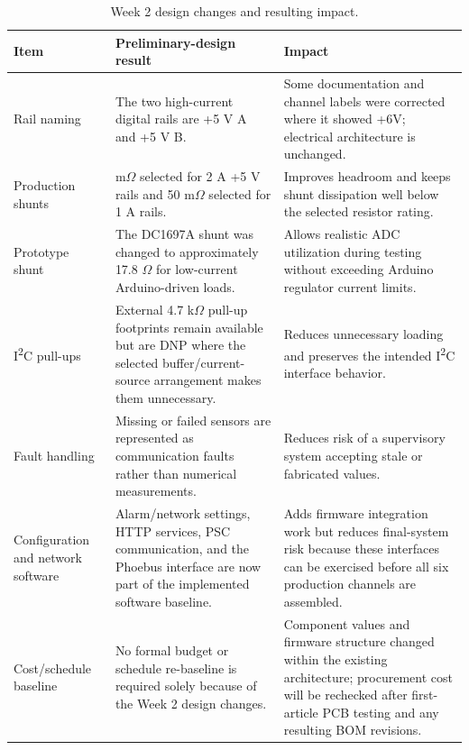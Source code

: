 \begin{table}[H]
    \centering
    \caption{Week 2 design changes and resulting impact.}
    \label{tab:w2-changes}
    \begin{tabularx}{\textwidth}{>{\raggedright\arraybackslash}p{}>{\raggedright\arraybackslash}p{}X}
        \toprule
        \textbf{Item} & \textbf{Preliminary-design result} & \textbf{Impact} \\
        \midrule
        Rail naming & The two high-current digital rails are +5 V A and +5 V B. & Some documentation and channel labels were corrected where it showed +6V; electrical architecture is unchanged. \\
        Production shunts & 39 m\(\Omega\) selected for 2 A +5 V rails and 50 m\(\Omega\) selected for 1 A rails. & Improves headroom and keeps shunt dissipation well below the selected resistor rating. \\
        Prototype shunt & The DC1697A shunt was changed to approximately 17.8 \(\Omega\) for low-current Arduino-driven loads. & Allows realistic ADC utilization during testing without exceeding Arduino regulator current limits. \\
        I\textsuperscript{2}C pull-ups & External 4.7 k\(\Omega\) pull-up footprints remain available but are DNP where the selected buffer/current-source arrangement makes them unnecessary. & Reduces unnecessary loading and preserves the intended I\textsuperscript{2}C interface behavior. \\
        Fault handling & Missing or failed sensors are represented as communication faults rather than numerical measurements. & Reduces risk of a supervisory system accepting stale or fabricated values. \\
        Configuration and network software & Alarm/network settings, HTTP services, PSC communication, and the Phoebus interface are now part of the implemented software baseline. & Adds firmware integration work but reduces final-system risk because these interfaces can be exercised before all six production channels are assembled. \\
        Cost/schedule baseline & No formal budget or schedule re-baseline is required solely because of the Week 2 design changes. & Component values and firmware structure changed within the existing architecture; procurement cost will be rechecked after first-article PCB testing and any resulting BOM revisions. \\
        \bottomrule
    \end{tabularx}
\end{table}

